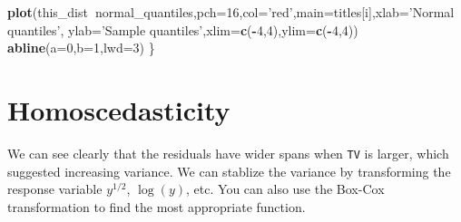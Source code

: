 \documentclass[12pt,]{book}
\newenvironment{Shaded}{\begin{snugshade}}{\end{snugshade}}
\newcommand{\KeywordTok}[1]{\textcolor[rgb]{0.13,0.29,0.53}{\textbf{#1}}}
\newcommand{\DataTypeTok}[1]{\textcolor[rgb]{0.13,0.29,0.53}{#1}}
\newcommand{\DecValTok}[1]{\textcolor[rgb]{0.00,0.00,0.81}{#1}}
\newcommand{\StringTok}[1]{\textcolor[rgb]{0.31,0.60,0.02}{#1}}
\newcommand{\OperatorTok}[1]{\textcolor[rgb]{0.81,0.36,0.00}{\textbf{#1}}}
\newcommand{\NormalTok}[1]{#1}
\begin{document}
\begin{Shaded}
\begin{Highlighting}[]
\KeywordTok{plot}\NormalTok{(this_dist}\OperatorTok{~}\NormalTok{normal_quantiles,}\DataTypeTok{pch=}\DecValTok{16}\NormalTok{,}\DataTypeTok{col=}\StringTok{'red'}\NormalTok{,}\DataTypeTok{main=}\NormalTok{titles[i],}\DataTypeTok{xlab=}\StringTok{'Normal quantiles'}\NormalTok{, }\DataTypeTok{ylab=}\StringTok{'Sample quantiles'}\NormalTok{,}\DataTypeTok{xlim=}\KeywordTok{c}\NormalTok{(}\OperatorTok{-}\DecValTok{4}\NormalTok{,}\DecValTok{4}\NormalTok{),}\DataTypeTok{ylim=}\KeywordTok{c}\NormalTok{(}\OperatorTok{-}\DecValTok{4}\NormalTok{,}\DecValTok{4}\NormalTok{))}
\KeywordTok{abline}\NormalTok{(}\DataTypeTok{a=}\DecValTok{0}\NormalTok{,}\DataTypeTok{b=}\DecValTok{1}\NormalTok{,}\DataTypeTok{lwd=}\DecValTok{3}\NormalTok{)}
\NormalTok{\}}
\end{Highlighting}
\end{Shaded}

\section{Homoscedasticity}\label{homoscedasticity}

We can see clearly that the residuals have wider spans when \texttt{TV}
is larger, which suggested increasing variance. We can stablize the
variance by transforming the response variable \(y^{1/2}\), \(\log(y)\),
etc. You can also use the Box-Cox transformation to find the most
appropriate function.
\end{document}
